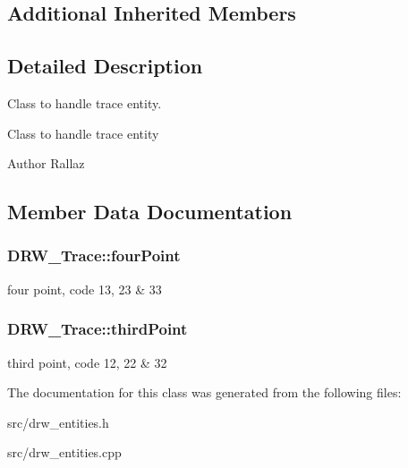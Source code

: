\subsection*{Additional Inherited Members}


\subsection{Detailed Description}
Class to handle trace entity. 

Class to handle trace entity \begin{DoxyAuthor}{Author}
Rallaz 
\end{DoxyAuthor}


\subsection{Member Data Documentation}
\hypertarget{class_d_r_w___trace_a96d7a3b877a7f26f6a8b8cdbc9ced660}{}
\subsubsection[{four\+Point}]{ D\+R\+W\+\_\+\+Trace\+::four\+Point}\label{class_d_r_w___trace_a96d7a3b877a7f26f6a8b8cdbc9ced660}
four point, code 13, 23 \& 33 \hypertarget{class_d_r_w___trace_adadabbf354ee19cfe3869c790e6de3ec}{}
\subsubsection[{third\+Point}]{ D\+R\+W\+\_\+\+Trace\+::third\+Point}\label{class_d_r_w___trace_adadabbf354ee19cfe3869c790e6de3ec}
third point, code 12, 22 \& 32 

The documentation for this class was generated from the following files\+:\begin{DoxyCompactItemize}
\item 
src/drw\+\_\+entities.\+h\item 
src/drw\+\_\+entities.\+cpp\end{DoxyCompactItemize}
